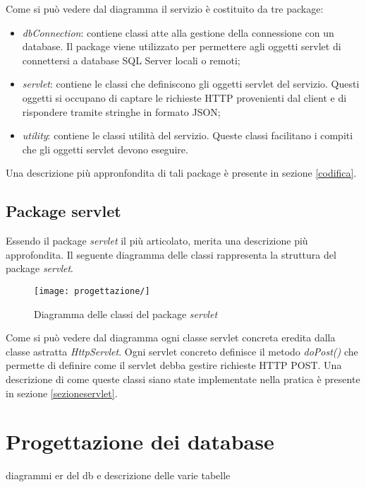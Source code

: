 Come si può vedere dal diagramma il servizio è costituito da tre package:
\begin{itemize}
	\item \textit{dbConnection}: contiene classi atte alla gestione della connessione con un database. Il package viene utilizzato per permettere agli oggetti servlet di connettersi a database SQL Server locali o remoti;
	\item \textit{servlet}: contiene le classi che definiscono gli oggetti servlet del servizio. Questi oggetti si occupano di captare le richieste HTTP provenienti dal client e di rispondere tramite stringhe in formato JSON;
	\item \textit{utility}: contiene le classi utilità del servizio. Queste classi facilitano i compiti che gli oggetti servlet devono eseguire.
\end{itemize}
Una descrizione più appronfondita di tali package è presente in sezione \ref{codifica}.

\subsection{Package servlet}

Essendo il package \textit{servlet} il più articolato, merita una descrizione più approfondita. Il seguente diagramma delle classi rappresenta la struttura del package \textit{servlet}.

\begin{figure}[!h] 
    \centering 
    \texttt{[image: progettazione/]} 
    \caption{Diagramma delle classi del package \textit{servlet}}
\end{figure}

Come si può vedere dal diagramma ogni classe servlet concreta eredita dalla classe astratta \textit{HttpServlet}. Ogni servlet concreto definisce il metodo \textit{doPost()} che permette di definire come il servlet debba gestire richieste HTTP POST. Una descrizione di come queste classi siano state implementate nella pratica è presente in sezione \ref{sezioneservlet}.

\section{Progettazione dei database}

diagrammi er del db e descrizione delle varie tabelle

